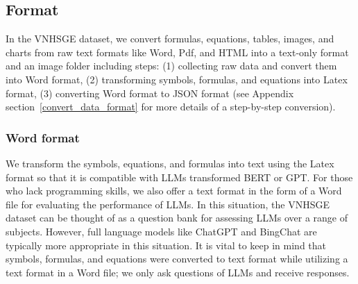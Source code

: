 \documentclass{article}
\begin{document}
{	\subsection{Format}
	\label{sec:Format}
	
	In the VNHSGE dataset, we convert formulas, equations, tables, images, and charts from raw text formats like Word, Pdf, and HTML into a text-only format and an image folder including steps: (1) collecting raw data and convert them into Word format, (2) transforming symbols, formulas, and equations into Latex format, (3) converting Word format to JSON format (see Appendix section~\ref{convert_data_format} for more details of a step-by-step conversion).  
	
	\subsubsection{Word format}
	
	We transform the symbols, equations, and formulas into text using the Latex format so that it is compatible with LLMs transformed BERT or GPT. For those who lack programming skills, we also offer a text format in the form of a Word file for evaluating the performance of LLMs. In this situation, the VNHSGE dataset can be thought of as a question bank for assessing LLMs over a range of subjects. However, full language models like ChatGPT and BingChat are typically more appropriate in this situation. It is vital to keep in mind that symbols, formulas, and equations were converted to text format while utilizing a text format in a Word file; we only ask questions of LLMs and receive responses.
	
}
\end{document}
